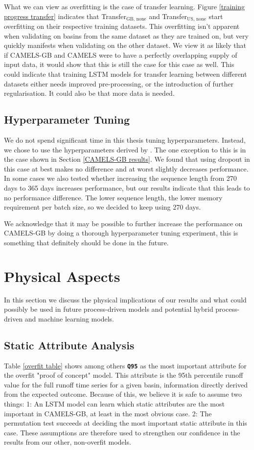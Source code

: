  What we can view as overfitting is the case of transfer learning. Figure 
 \ref{training progress transfer} indicates that Transfer$_\text{GB, none}$ 
 and Transfer$_\text{US, none}$ start overfitting on their respective training 
 datasets. This overfitting isn't apparent when validating on basins from the 
 same dataset as they are trained on, but very quickly manifests when validating 
 on the other dataset. We view it as likely that if CAMELS-GB and CAMELS were to 
 have a perfectly overlapping supply of input data, it would show that this is 
 still the case for this case as well. This could indicate that training LSTM models 
 for transfer learning between different datasets either needs improved pre-processing, 
 or the introduction of further regularisation. It could also be that more data is needed.
\subsection{Hyperparameter Tuning}
We do not spend significant time in this thesis tuning hyperparameters. Instead, 
we chose to use the hyperparameters derived by \citet{lstm_second_paper}. The one 
exception to this is in the case shown in Section \ref{CAMELS-GB results}. We found 
that using dropout in this case at best makes no difference and at worst slightly 
decreases performance. In some cases we also tested whether increasing the 
sequence length from 270 days to 365 days increases performance, but our results 
indicate that this leads to no performance difference. The lower sequence length, 
the lower memory requirement per batch size, so we decided to keep using 270 days. 

We acknowledge that it may be possible to further increase the performance on 
CAMELS-GB by doing a thorough hyperparameter tuning experiment, this is 
something that definitely should be done in the future. 
\section{Physical Aspects}
In this section we discuss the physical implications of our results and what could 
possibly be used in future process-driven models and potential hybrid process-driven 
and machine learning models.
\subsection{Static Attribute Analysis}
\label{discuss static attributes}
Table \ref{overfit table} shows among others \textbf{\texttt{Q95}} as the most 
important attribute for the overfit "proof of concept" model. This attribute is the 
95th percentile runoff value for the full runoff time series for a given basin, 
information directly derived from the expected outcome. 
Because of this, we believe it is 
safe to assume two things: 1: An LSTM model can learn which static attributes are 
the most important in CAMELS-GB, at least in the most obvious case. 2: The permutation test 
succeeds at deciding the most important static attribute in this case. These 
assumptions are therefore used to strengthen our confidence in the results from 
our other, non-overfit models. 

